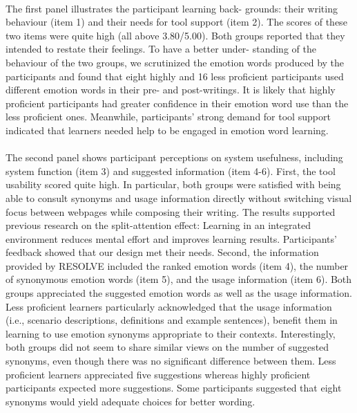 \documentclass[a4paper,12pt,oneside]{article}
\begin{document}
\paragraph{}
The first panel illustrates the participant learning back- grounds: their writing behaviour (item 1) and their needs for tool support (item 2). The scores of these two items were quite high (all above 3.80/5.00). Both groups reported that they intended to restate their feelings. To have a better under- standing of the behaviour of the two groups, we scrutinized the emotion words produced by the participants and found that eight highly and 16 less proficient participants used different emotion words in their pre- and post-writings. It is likely that highly proficient participants had greater confidence in their emotion word use than the less proficient ones. Meanwhile, participants’ strong demand for tool support indicated that learners needed help to be engaged in emotion word learning. 
\paragraph{}
The second panel shows participant perceptions on system usefulness, including system function (item 3) and suggested information (item 4-6). First, the tool usability scored quite high. In particular, both groups were satisfied with being able to consult synonyms and usage information directly without switching visual focus between webpages while composing their writing. The results supported previous research on the split-attention effect: Learning in an integrated environment reduces mental effort and improves learning results. Participants’ feedback showed that our design met their needs. Second, the information provided by RESOLVE included the ranked emotion words (item 4), the number of synonymous emotion words (item 5), and the usage information (item 6). Both groups appreciated the suggested emotion words as well as the usage information. Less proficient learners particularly acknowledged that the usage information (i.e., scenario descriptions, definitions and example sentences), benefit them in learning to use emotion synonyms appropriate to their contexts. Interestingly, both groups did not seem to share similar views on the number of suggested synonyms, even though there was no significant difference between them. Less proficient learners appreciated five suggestions whereas highly proficient participants expected more suggestions. Some participants suggested that eight synonyms would yield adequate choices for better wording. 
\end{document}
